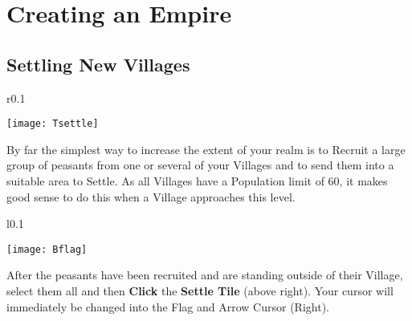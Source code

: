 
\chapter{Creating an Empire}


\section{Settling New Villages}

\begin{wrapfigure}{r}{0.1\textwidth}
	\vspace{-20pt}
	\begin{center}
		\texttt{[image: Tsettle]}
	\end{center}
	\vspace{-20pt}
\end{wrapfigure}

By far the simplest way to increase the extent of your realm is to Recruit a large group of peasants from one or several of your Villages and to send them into a suitable area to Settle. As all Villages have a Population limit of 60, it makes good sense to do this when a Village approaches this level.

\begin{wrapfigure}{l}{0.1\textwidth}
	\vspace{-20pt}
	\begin{center}
		\texttt{[image: Bflag]}
	\end{center}
	\vspace{-20pt}
\end{wrapfigure}

After the peasants have been recruited and are standing outside of their Village, select them all and then \textbf{Click} the \textbf{Settle Tile} (above right). Your cursor will immediately be changed into the Flag and Arrow Cursor (Right).


